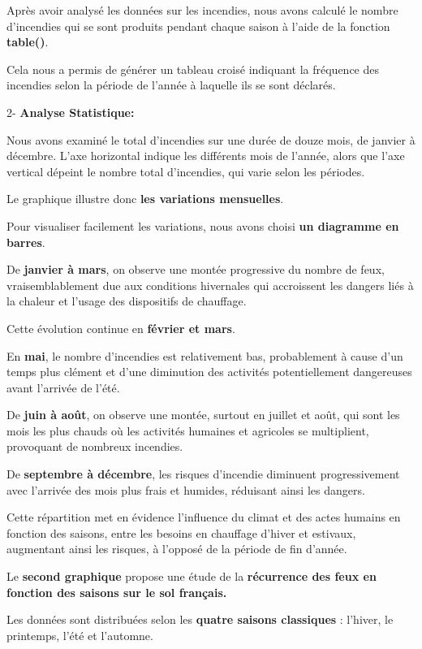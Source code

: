 \documentclass[
]{article}
\begin{document}
Après avoir analysé les données sur les incendies, nous avons calculé le
nombre d'incendies qui se sont produits pendant chaque saison à l'aide
de la fonction \textbf{table()}.

Cela nous a permis de générer un tableau croisé indiquant la fréquence
des incendies selon la période de l'année à laquelle ils se sont
déclarés.

2- \textbf{Analyse Statistique:}

Nous avons examiné le total d'incendies sur une durée de douze mois, de
janvier à décembre. L'axe horizontal indique les différents mois de
l'année, alors que l'axe vertical dépeint le nombre total d'incendies,
qui varie selon les périodes.

Le graphique illustre donc \textbf{les variations mensuelles}.

Pour visualiser facilement les variations, nous avons choisi \textbf{un
diagramme en barres}.

De \textbf{janvier à mars}, on observe une montée progressive du nombre
de feux, vraisemblablement due aux conditions hivernales qui accroissent
les dangers liés à la chaleur et l'usage des dispositifs de chauffage.

Cette évolution continue en \textbf{février et mars}.

En \textbf{mai}, le nombre d'incendies est relativement bas,
probablement à cause d'un temps plus clément et d'une diminution des
activités potentiellement dangereuses avant l'arrivée de l'été.

De \textbf{juin à août}, on observe une montée, surtout en juillet et
août, qui sont les mois les plus chauds où les activités humaines et
agricoles se multiplient, provoquant de nombreux incendies.

De \textbf{septembre à décembre}, les risques d'incendie diminuent
progressivement avec l'arrivée des mois plus frais et humides, réduisant
ainsi les dangers.

Cette répartition met en évidence l'influence du climat et des actes
humains en fonction des saisons, entre les besoins en chauffage d'hiver
et estivaux, augmentant ainsi les risques, à l'opposé de la période de
fin d'année.

Le \textbf{second graphique} propose une étude de la \textbf{récurrence
des feux en fonction des saisons sur le sol français.}

Les données sont distribuées selon les \textbf{quatre saisons
classiques} : l'hiver, le printemps, l'été et l'automne.
\end{document}
